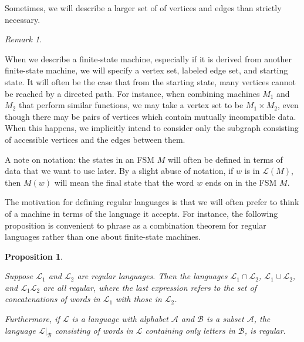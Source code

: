\documentclass[10pt,a4paper]{amsart}
\newtheorem{proposition}[theorem]{Proposition}
\theoremstyle{definition}
\theoremstyle{remark}
\newtheorem{remark}[theorem]{Remark}
\begin{document}
	Sometimes, we will describe a larger set of of vertices and edges than strictly necessary.
	
	\begin{remark}\label{DescribingFSMs}
		
		When we describe a finite-state machine, especially if it is derived from another finite-state machine, we will specify a vertex set, labeled edge set, and starting state. It will often be the case that from the starting state, many vertices cannot be reached by a directed path. For instance, when combining machines $M_1$ and $M_2$ that perform similar functions, we may take a vertex set to be $M_1\times M_2$, even though there may be pairs of vertices which contain mutually incompatible data. When this happens, we implicitly intend to consider only the subgraph consisting of accessible vertices and the edges between them. 
		
	\end{remark}
	
	A note on notation: the states in an FSM $M$ will often be defined in terms of data that we want to use later. By a slight abuse of notation, if $w$ is in $\mathscr{L}(M)$, then $M(w)$ will mean the final state that the word $w$ ends on in the FSM $M$. 
	
	The motivation for defining regular languages is that we will often prefer to think of a machine in terms of the language it accepts. For instance, the following proposition is convenient to phrase as a combination theorem for regular languages rather than one about finite-state machines.
	
	\begin{proposition}\label{CombiningFSMs}
		
		Suppose $\mathscr{L}_1$ and $\mathscr{L}_2$ are regular languages. Then the languages \newline $\mathscr{L}_1\cap \mathscr{L}_2$, $\mathscr{L}_1\cup \mathscr{L}_2$, and $\mathscr{L}_1\mathscr{L}_2$ are all regular, where the last expression refers to the set of concatenations of words in $\mathscr{L}_1$ with those in $\mathscr{L}_2$.
		
		Furthermore, if $\mathscr{L}$ is a language with alphabet $\mathscr{A}$ and $\mathscr{B}$ is a subset $\mathscr{A}$, the language $\mathscr{L}|_{\mathscr{B}}$ consisting of words in $\mathscr{L}$ containing only letters in $\mathscr{B}$, is regular.
		
	\end{proposition}
	
\end{document}
